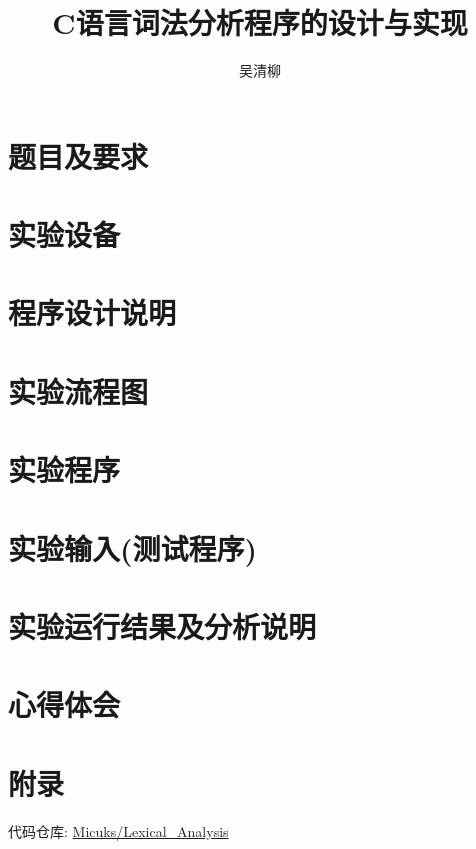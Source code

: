 \documentclass[12pt]{article}
\title{C语言词法分析程序的设计与实现}
\author{\textup{吴清柳}}
\begin{document}

\tableofcontents
\newpage

\pagestyle{fancy}
\fancyhead{} %
\fancyfoot{} %
\fancyfoot[CE, CO]{\thepage}

\section{题目及要求}

\section{实验设备}

\section{程序设计说明}

\section{实验流程图}

\section{实验程序}

\section{实验输入(测试程序)}

\section{实验运行结果及分析说明}

\section{心得体会}

\section{附录}
代码仓库: \href{https://github.com/Micuks/Lexical\_Analysis}{Micuks/Lexical\_Analysis}

% 
% 
\end{document}
